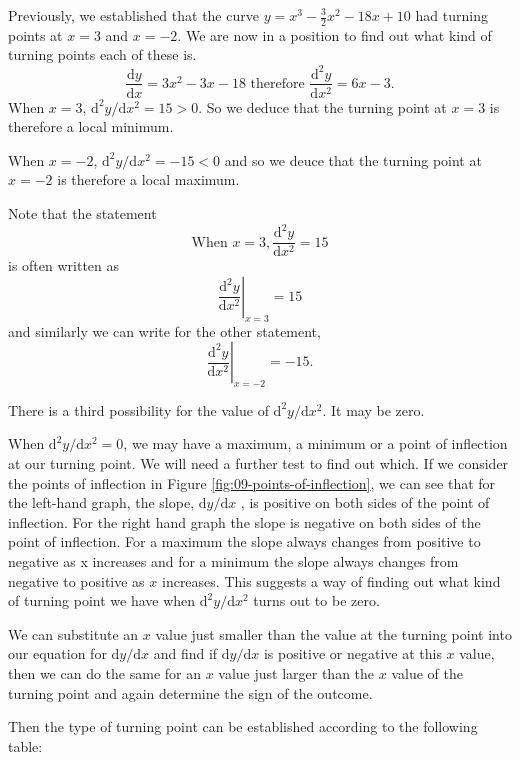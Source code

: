 \documentclass[
  11pt,
  oneside]{book}
\newcommand{\slide}{}
\theoremstyle{definition}
\theoremstyle{definition}
\theoremstyle{definition}
\theoremstyle{definition}
\theoremstyle{remark}
\begin{document}
Previously, we established that the curve \(y = x^3-\frac32 x^2-18x+10\) had turning points at \(x=3\) and \(x=-2\). We are now in a position to find out what kind of turning points each of these is.
\[
\frac{\mathrm{d} y}{\mathrm{d} x} = 3x^2-3x-18\text{ therefore } \frac{\mathrm{d}^{2}y}{\mathrm{d} x^2} = 6x-3.
\]
When \(x = 3\), \(\mathrm{d}^{2}y/\mathrm{d} x^2=15 > 0\). So we deduce that the turning point at \(x=3\) is therefore a local minimum.

When \(x = -2\), \(\mathrm{d}^{2}y/\mathrm{d} x^2 = -15 < 0\) and so we deuce that the turning point at \(x = -2\) is therefore a local maximum.

\slide

Note that the statement
\[
\text{When }x = 3, \frac{\mathrm{d}^{2}y}{\mathrm{d} x^2} = 15
\]
is often written as
\[
\left.\frac{\mathrm{d}^{2}y}{\mathrm{d} x^2}\right\vert_{x=3} = 15
\]
and similarly we can write for the other statement,
\[
\left.\frac{\mathrm{d}^{2}y}{\mathrm{d} x^2}\right\vert_{x=-2} = -15.
\]
\slide

There is a third possibility for the value of \(\mathrm{d}^{2}y/\mathrm{d} x^2\). It may be zero.

When \(\mathrm{d}^{2}y/\mathrm{d} x^2=0\), we may have a maximum, a minimum or a point of inflection at our turning point. We will need a further test to find out which. If we consider the points of inflection in Figure \ref{fig:09-points-of-inflection}, we can see that for the left-hand graph, the slope, \(\mathrm{d}y/\mathrm{d} x\) , is positive on both sides of the point of inflection. For the right hand graph the slope is negative on both sides of the point of inflection. For a maximum the slope always changes from positive to negative as x increases and for a minimum the slope always changes from negative to positive as \(x\) increases. This suggests a way of finding out what kind of turning point we have when \(\mathrm{d}^{2}y/\mathrm{d} x^2\) turns out to be zero.

\slide

We can substitute an \(x\) value just smaller than the value at the turning point into our equation for \(\mathrm{d}y/\mathrm{d} x\) and find if \(\mathrm{d}y/\mathrm{d} x\) is positive or negative at this \(x\) value, then we can do the same for an \(x\) value just larger than the \(x\) value of the turning point and again determine the sign of the outcome.

\slide

Then the type of turning point can be established according to the following table:
\end{document}
